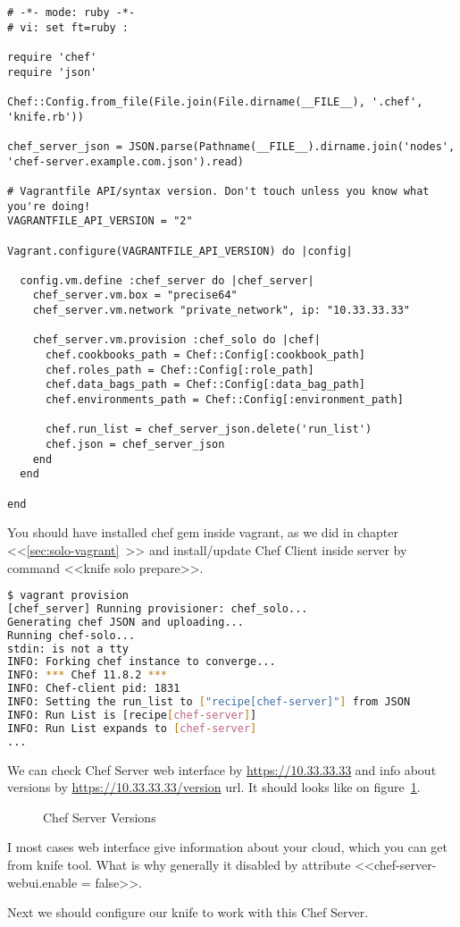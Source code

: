 \begin{lstlisting}[label=lst:my-server-cloud-installation6,title=my-server-cloud/Vagrantfile]
# -*- mode: ruby -*-
# vi: set ft=ruby :

require 'chef'
require 'json'

Chef::Config.from_file(File.join(File.dirname(__FILE__), '.chef', 'knife.rb'))

chef_server_json = JSON.parse(Pathname(__FILE__).dirname.join('nodes', 'chef-server.example.com.json').read)

# Vagrantfile API/syntax version. Don't touch unless you know what you're doing!
VAGRANTFILE_API_VERSION = "2"

Vagrant.configure(VAGRANTFILE_API_VERSION) do |config|

  config.vm.define :chef_server do |chef_server|
    chef_server.vm.box = "precise64"
    chef_server.vm.network "private_network", ip: "10.33.33.33"

    chef_server.vm.provision :chef_solo do |chef|
      chef.cookbooks_path = Chef::Config[:cookbook_path]
      chef.roles_path = Chef::Config[:role_path]
      chef.data_bags_path = Chef::Config[:data_bag_path]
      chef.environments_path = Chef::Config[:environment_path]

      chef.run_list = chef_server_json.delete('run_list')
      chef.json = chef_server_json
    end
  end

end
\end{lstlisting}

You should have installed chef gem inside vagrant, as we did in chapter <<\ref{sec:solo-vagrant}~>> and install/update Chef Client inside server by command <<knife solo prepare>>.

\begin{lstlisting}[language=Bash,label=lst:my-server-cloud-installation7]
$ vagrant provision
[chef_server] Running provisioner: chef_solo...
Generating chef JSON and uploading...
Running chef-solo...
stdin: is not a tty
INFO: Forking chef instance to converge...
INFO: *** Chef 11.8.2 ***
INFO: Chef-client pid: 1831
INFO: Setting the run_list to ["recipe[chef-server]"] from JSON
INFO: Run List is [recipe[chef-server]]
INFO: Run List expands to [chef-server]
...
\end{lstlisting}

We can check Chef Server web interface by \href{https://10.33.33.33}{https://10.33.33.33} and info about versions by \href{https://10.33.33.33/version}{https://10.33.33.33/version} url. It should looks like on figure~\ref{fig:chef-server-versions}.

\begin{figure}[ht!]
  \caption{Chef Server Versions}
  \label{fig:chef-server-versions}
\end{figure}

I most cases web interface give information about your cloud, which you can get from knife tool. What is why generally it disabled by attribute <<chef-server-webui.enable = false>>.

Next we should configure our knife to work with this Chef Server.
